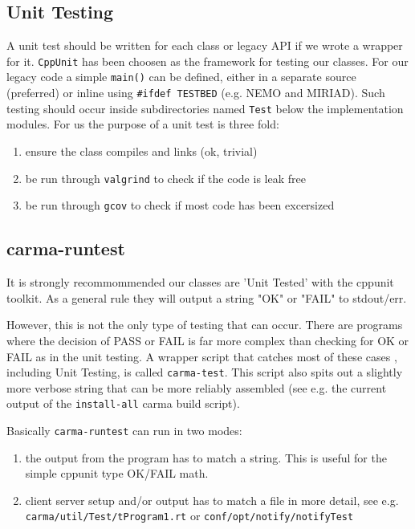 \documentclass{article}
\begin{document}
%

\subsection{Unit Testing} 

A unit test should be written for each class or legacy API if we wrote
a wrapper for it. {\tt CppUnit} has
been choosen as the framework for testing our classes.
For our legacy code a simple {\tt main()}
can be defined, either in a separate source (preferred) or inline
using {\tt \#ifdef TESTBED} (e.g. NEMO and MIRIAD). Such testing should
occur inside subdirectories named {\tt Test} below the implementation
modules. For us the purpose of a unit test is three fold:
\begin{enumerate}
\item ensure the class compiles and links (ok, trivial)
\item be run through {\tt valgrind} to check if the code is leak free
\item be run through {\tt gcov} to check if most code has been excersized
\end{enumerate}


\subsection{carma-runtest}

It is strongly recommommended our classes are 'Unit Tested' with
the cppunit toolkit. As a general rule they will output a string
"OK" or "FAIL" to stdout/err.

However, this is not the only type of testing that can occur. There
are programs where the decision of PASS or FAIL is far more complex
than checking for OK or FAIL as in the unit testing. A wrapper
script that catches most of these cases , including Unit Testing,
is called {\tt carma-test}. This script also
spits out a slightly more verbose string
that can be more reliably assembled (see e.g. the current output
of the {\tt install-all} carma build script). 

Basically {\tt carma-runtest} can run in two modes:
\begin{enumerate}
\item
the output from the program has
to match a string. This is useful for the simple cppunit type OK/FAIL
math.

\item
client server setup and/or output has to match a file in more
detail, see e.g. {\tt carma/util/Test/tProgram1.rt} or
{\tt conf/opt/notify/notifyTest}

\end{enumerate}
\end{document}
